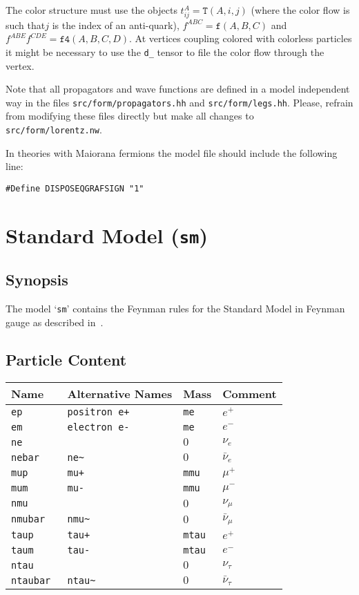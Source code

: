 \documentclass[11pt,a4paper]{refrep}
\begin{document}
The color structure must use the objects $t_{ij}^A=\mathtt{T}(A, i, j)$ (where the color flow is such
that$j$ is the index of an anti-quark), $f^{ABC}=\mathtt{f}(A, B, C)$ and
$f^{ABE}f^{CDE}=\mathtt{f4}(A,B,C,D)$. At vertices coupling colored with colorless particles
it might be necessary to use the \texttt{d\_} tensor to file the color flow through the vertex.

\attention Note that all propagators and wave functions are defined in a model independent
way in the files \texttt{src/form/propagators.hh} and \texttt{src/form/legs.hh}. Please,
refrain from modifying these files directly but make all changes to \texttt{src/form/lorentz.nw}.

In theories with Maiorana fermions the model file should include the following
line:
\begin{lstlisting}[language=form]
#Define DISPOSEQGRAFSIGN "1"
\end{lstlisting}

\section{Standard Model (\texttt{sm})}
\label{sec:model-files:sm}
\subsection{Synopsis}
The model `\texttt{sm}' contains the Feynman rules for the
Standard Model in Feynman gauge as described
in~\cite[Appendix~A]{Boehm:2001}.

\subsection{Particle Content}
\begin{tabular}{|l|l|l|p{2cm}|}
\hline
Name&Alternative Names&Mass&Comment\\
\hline
\tt ep & \tt positron e+ & \tt me& $e^+$\\
\tt em & \tt electron e- & \tt me& $e^-$\\
\tt ne & & $0$ & $\nu_e$\\
\tt nebar & \tt ne\~& $0$ & $\bar{\nu}_e$\\
\hline
\tt mup & \tt mu+ & \tt mmu& $\mu^+$\\
\tt mum & \tt mu- & \tt mmu& $\mu^-$\\
\tt nmu & & $0$ & $\nu_\mu$\\
\tt nmubar & \tt nmu\~ & $0$ & $\bar{\nu}_\mu$\\
\hline
\tt taup & \tt tau+ & \tt mtau& $e^+$\\
\tt taum & \tt tau- & \tt mtau& $e^-$\\
\tt ntau & & $0$ & $\nu_\tau$\\
\tt ntaubar & \tt ntau\~ & $0$ & $\bar{\nu}_\tau$\\
\hline
\end{tabular}
\end{document}
